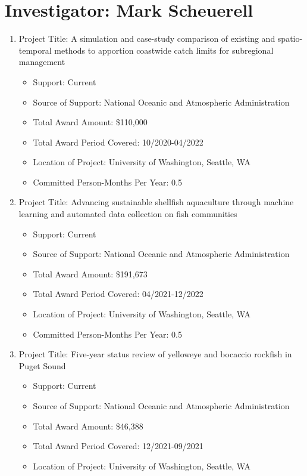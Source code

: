 \documentclass[12pt]{elsarticle}
\begin{document}
\section*{Investigator: Mark Scheuerell}

\begin{enumerate}
\item Project Title: A simulation and case-study comparison of existing and spatio-temporal methods to apportion coastwide catch limits for subregional management
\begin{itemize}
\item Support: Current
\item Source of Support: National Oceanic and Atmospheric Administration
\item Total Award Amount: \$110,000
\item Total Award Period Covered: 10/2020-04/2022
\item Location of Project: University of Washington, Seattle, WA
\item Committed Person-Months Per Year: 0.5
\end{itemize}
\item Project Title: Advancing sustainable shellfish aquaculture through machine learning and automated data collection on fish communities
\begin{itemize}
\item Support: Current
\item Source of Support: National Oceanic and Atmospheric Administration
\item Total Award Amount: \$191,673
\item Total Award Period Covered: 04/2021-12/2022
\item Location of Project: University of Washington, Seattle, WA
\item Committed Person-Months Per Year: 0.5
\end{itemize}
\item Project Title: Five-year status review of yelloweye and bocaccio rockfish in Puget Sound
\begin{itemize}
\item Support: Current
\item Source of Support: National Oceanic and Atmospheric Administration
\item Total Award Amount: \$46,388
\item Total Award Period Covered: 12/2021-09/2021
\item Location of Project: University of Washington, Seattle, WA

\end{itemize}
\end{enumerate}
\end{document}
